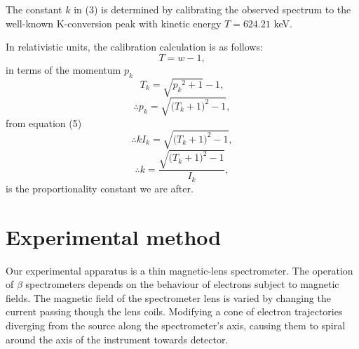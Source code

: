 \documentclass[10pt, a4paper]{article}
\begin{document}
\begin{multicols}{2}
The constant $k$ in (3) is determined by calibrating the observed spectrum to the well-known K-conversion peak with kinetic energy $T = 624.21$ keV.
 
In relativistic units, the calibration calculation is as follows:
\begin{equation}T = w - 1,
\end{equation}
in terms of the momentum $p_k$
\begin{equation}T_k = \sqrt{{p_{k}}^{2} + 1} -1,
\end{equation}
\begin{equation} \therefore p_k = \sqrt{({T_{k} + 1)}^{2} - 1 },
\end{equation}
from equation (5)
\begin{equation} \therefore k I_k = \sqrt{({T_{k} + 1)}^{2} - 1 },
\end{equation}
\begin{equation} \therefore k = \frac{\sqrt{({T_{k} + 1)}^{2} - 1 }}{I_k},
\end{equation}
is the proportionality constant we are after.

\section{Experimental method}
Our experimental apparatus is a thin magnetic-lens spectrometer. 
The operation of $\beta$ spectrometers depends on the behaviour of electrons subject to magnetic fields. The magnetic field of the spectrometer lens is varied by changing the current passing though the lens coils.
Modifying a cone of electron trajectories diverging from the source along the spectrometer's axis, causing them to spiral around the axis of the instrument towards detector\cite{SPA}. 














\end{multicols}
\end{document}
